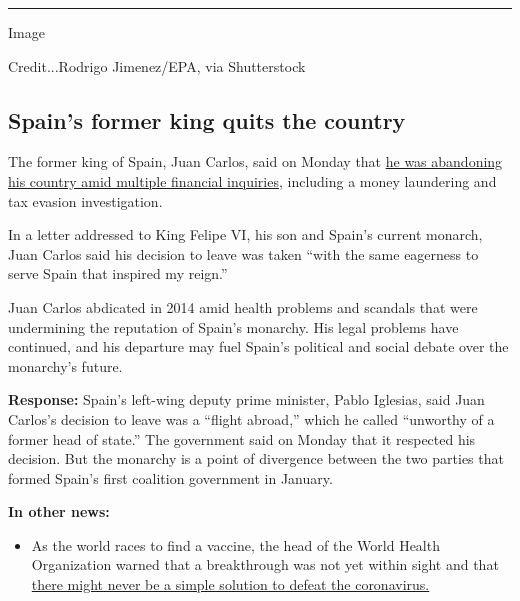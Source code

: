 \begin{center}\rule{0.5\linewidth}{\linethickness}\end{center}

Image

Credit...Rodrigo Jimenez/EPA, via Shutterstock

\hypertarget{spains-former-king-quits-the-country}{%
\subsection{Spain's former king quits the
country}\label{spains-former-king-quits-the-country}}

The former king of Spain, Juan Carlos, said on Monday that
\href{https://www.nytimes3xbfgragh.onion/2020/08/03/world/europe/juan-carlos-leaves-spain.html}{he
was abandoning his country amid multiple financial inquiries}, including
a money laundering and tax evasion investigation.

In a letter addressed to King Felipe VI, his son and Spain's current
monarch, Juan Carlos said his decision to leave was taken ``with the
same eagerness to serve Spain that inspired my reign.''

Juan Carlos abdicated in 2014 amid health problems and scandals that
were undermining the reputation of Spain's monarchy. His legal problems
have continued, and his departure may fuel Spain's political and social
debate over the monarchy's future.

\textbf{Response:} Spain's left-wing deputy prime minister, Pablo
Iglesias, said Juan Carlos's decision to leave was a ``flight abroad,''
which he called ``unworthy of a former head of state.'' The government
said on Monday that it respected his decision. But the monarchy is a
point of divergence between the two parties that formed Spain's first
coalition government in January.

\textbf{In other news:}

\begin{itemize}
\tightlist
\item
  As the world races to find a vaccine, the head of the World Health
  Organization warned that a breakthrough was not yet within sight and
  that
  \href{https://www.nytimes3xbfgragh.onion/2020/08/03/world/coronavirus-covid-19.html?action=click\&pgtype=Article\&state=default\&module=styln-coronavirus\&region=TOP_BANNER\&context=storylines_menu}{there
  might never be a simple solution to defeat the coronavirus.}
\end{itemize}

